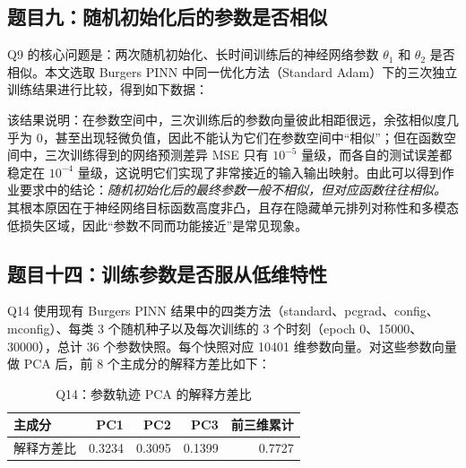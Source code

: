 \documentclass[UTF8,a4paper,12pt,fontset=none]{ctexart}
\begin{document}
\subsection{题目九：随机初始化后的参数是否相似}

Q9 的核心问题是：两次随机初始化、长时间训练后的神经网络参数 $\theta_1$ 和 $\theta_2$ 是否相似。本文选取 Burgers PINN 中同一优化方法（Standard Adam）下的三次独立训练结果进行比较，得到如下数据：

\begin{table}[H]
\centering
\scriptsize
{}
\caption{Q9：不同随机初始化的 Burgers PINN 最终参数比较}
\end{table}

该结果说明：在参数空间中，三次训练后的参数向量彼此相距很远，余弦相似度几乎为 0，甚至出现轻微负值，因此不能认为它们在参数空间中“相似”；但在函数空间中，三次训练得到的网络预测差异 MSE 只有 $10^{-5}$ 量级，而各自的测试误差都稳定在 $10^{-4}$ 量级，这说明它们实现了非常接近的输入输出映射。由此可以得到作业要求中的结论：\emph{随机初始化后的最终参数一般不相似，但对应函数往往相似。} 其根本原因在于神经网络目标函数高度非凸，且存在隐藏单元排列对称性和多模态低损失区域，因此“参数不同而功能接近”是常见现象。

\subsection{题目十四：训练参数是否服从低维特性}

Q14 使用现有 Burgers PINN 结果中的四类方法（standard、pcgrad、config、mconfig）、每类 3 个随机种子以及每次训练的 3 个时刻（epoch 0、15000、30000），总计 36 个参数快照。每个快照对应 10401 维参数向量。对这些参数向量做 PCA 后，前 8 个主成分的解释方差比如下：

\begin{table}[H]
\centering
\scriptsize
\begin{tabular}{lrrrr}
\toprule
主成分 & PC1 & PC2 & PC3 & 前三维累计 \\
\midrule
解释方差比 & 0.3234 & 0.3095 & 0.1399 & 0.7727 \\
\bottomrule
\end{tabular}
\caption{Q14：参数轨迹 PCA 的解释方差比}
\end{table}
\end{document}
